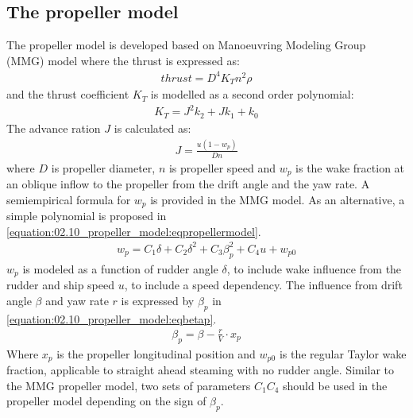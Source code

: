 \documentclass[review]{elsarticle}
\begin{document}
\subsection{The propeller model}
\label{\detokenize{02.10_propeller_model:the-propeller-model}}\label{\detokenize{02.10_propeller_model::doc}}
\sphinxAtStartPar
The propeller model is developed based on Manoeuvring Modeling Group (MMG) model \cite{yasukawa_introduction_2015-1} where the thrust is expressed as:
\begin{equation}\label{equation:02.10_propeller_model:eqT}
\begin{split}\displaystyle thrust = D^{4} K_{T} n^{2} \rho\end{split}
\end{equation}
\sphinxAtStartPar
and the thrust coefficient \(K_T\) is modelled as a second order polynomial:
\begin{equation}\label{equation:02.10_propeller_model:eqkt}
\begin{split}\displaystyle K_{T} = J^{2} k_{2} + J k_{1} + k_{0}\end{split}
\end{equation}
\sphinxAtStartPar
The advance ration \(J\) is calculated as:
\begin{equation}\label{equation:02.10_propeller_model:eqJ}
\begin{split}\displaystyle J = \frac{u \left(1 - w_{p}\right)}{D n}\end{split}
\end{equation}
\sphinxAtStartPar
where \(D\) is propeller diameter, \(n\) is propeller speed and \(w_p\) is the wake fraction at an oblique inflow to the propeller from the drift angle and the yaw rate. A semi\sphinxhyphen{}empirical formula for \(w_p\) is provided in the MMG model. As an alternative, a simple polynomial is proposed in \autoref{equation:02.10_propeller_model:eqpropellermodel}.
\begin{equation}\label{equation:02.10_propeller_model:eqpropellermodel}
\begin{split}\displaystyle w_{p} = C_{1} \delta + C_{2} \delta^{2} + C_{3} \beta_{p}^{2} + C_{4} u + w_{p0}\end{split}
\end{equation}
\sphinxAtStartPar
\(w_p\) is modeled as a function of rudder angle \(\delta\), to include wake influence from the rudder and ship speed \(u\), to include a speed dependency. The influence from drift angle \(\beta\) and yaw rate \(r\) is expressed by \(\beta_p\) in \autoref{equation:02.10_propeller_model:eqbetap}.
\begin{equation}\label{equation:02.10_propeller_model:eqbetap}
\begin{split}\beta_p=\beta - \frac{r}{V} \cdot x_p \end{split}
\end{equation}
\sphinxAtStartPar
Where \(x_p\) is the propeller longitudinal position and \(w_{p0}\) is the regular Taylor wake fraction, applicable to straight ahead steaming with no rudder angle. Similar to the MMG propeller model, two sets of parameters \(C_1\)\sphinxhyphen{}\(C_4\) should be used in the propeller model depending on the sign of \(\beta_p\).
\end{document}
